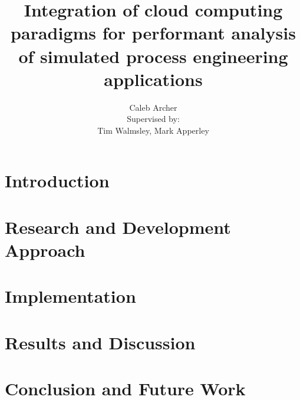\documentclass[12pt,a4paper]{uwthesis17}
\title{Integration of cloud computing paradigms for performant analysis of simulated process engineering applications}
\author{
  Caleb Archer \\
  Supervised by: \\
  Tim Walmsley, Mark Apperley
}
\begin{document}

\maketitle

\setcounter{page}{2}

\begin{abstract}

\end{abstract}

\begin{acknowledgements}

\end{acknowledgements}

\begin{authorship-declaration}

\end{authorship-declaration}

\tableofcontents

\listoffigures

\listoftables

\newpage

\setcounter{page}{1}

\chapter{Introduction}
\label{sec:intro}



\chapter{Research and Development Approach}



\chapter{Implementation}



\chapter{Results and Discussion}



\chapter{Conclusion and Future Work}


 

\end{document}

